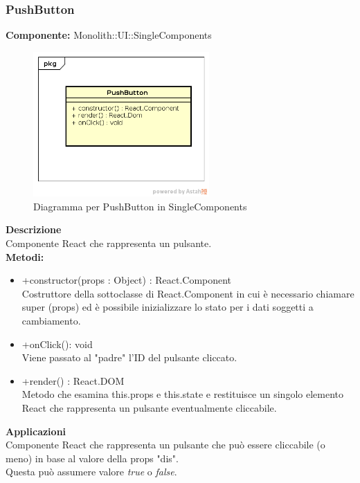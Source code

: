 \subsubsection{PushButton}
\textbf{Componente:}  Monolith::UI::SingleComponents\\
   \FloatBarrier
   \begin{figure}[ht]
   \centering
   \includegraphics[width=0.6\textwidth]{img/single-PushButton.png}
   \caption{{Diagramma per PushButton in SingleComponents}}
\end{figure}
\FloatBarrier
\textbf{Descrizione}\\
Componente React che rappresenta un pulsante. \\
\textbf{Metodi:} 
\begin{itemize}
\item +constructor(props : Object) : React.Component 
\\
Costruttore della sottoclasse di React.Component in cui è necessario chiamare super (props) ed è possibile inizializzare lo stato per i dati soggetti a cambiamento.

\item +onClick(): void 
\\ 
Viene passato al "padre" l'ID del pulsante cliccato.

\item +render() : React.DOM 
\\
Metodo che esamina this.props e this.state e restituisce un singolo elemento React che rappresenta un pulsante eventualmente cliccabile.

\end{itemize} 


\textbf{Applicazioni}\\
Componente React che rappresenta un pulsante che può essere cliccabile (o meno) in base al valore della props "dis". \\ Questa può assumere valore \textit{true} o \textit{false}. 


